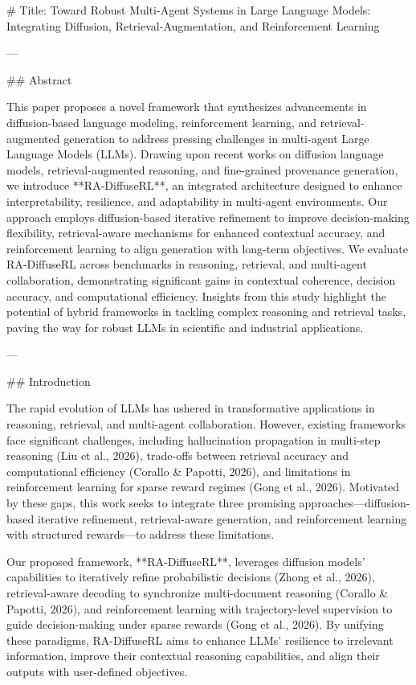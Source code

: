 # Title: Toward Robust Multi-Agent Systems in Large Language Models: Integrating Diffusion, Retrieval-Augmentation, and Reinforcement Learning

---

## Abstract

This paper proposes a novel framework that synthesizes advancements in diffusion-based language modeling, reinforcement learning, and retrieval-augmented generation to address pressing challenges in multi-agent Large Language Models (LLMs). Drawing upon recent works on diffusion language models, retrieval-augmented reasoning, and fine-grained provenance generation, we introduce **RA-DiffuseRL**, an integrated architecture designed to enhance interpretability, resilience, and adaptability in multi-agent environments. Our approach employs diffusion-based iterative refinement to improve decision-making flexibility, retrieval-aware mechanisms for enhanced contextual accuracy, and reinforcement learning to align generation with long-term objectives. We evaluate RA-DiffuseRL across benchmarks in reasoning, retrieval, and multi-agent collaboration, demonstrating significant gains in contextual coherence, decision accuracy, and computational efficiency. Insights from this study highlight the potential of hybrid frameworks in tackling complex reasoning and retrieval tasks, paving the way for robust LLMs in scientific and industrial applications.

---

## Introduction

The rapid evolution of LLMs has ushered in transformative applications in reasoning, retrieval, and multi-agent collaboration. However, existing frameworks face significant challenges, including hallucination propagation in multi-step reasoning (Liu et al., 2026), trade-offs between retrieval accuracy and computational efficiency (Corallo & Papotti, 2026), and limitations in reinforcement learning for sparse reward regimes (Gong et al., 2026). Motivated by these gaps, this work seeks to integrate three promising approaches—diffusion-based iterative refinement, retrieval-aware generation, and reinforcement learning with structured rewards—to address these limitations.

Our proposed framework, **RA-DiffuseRL**, leverages diffusion models' capabilities to iteratively refine probabilistic decisions (Zhong et al., 2026), retrieval-aware decoding to synchronize multi-document reasoning (Corallo & Papotti, 2026), and reinforcement learning with trajectory-level supervision to guide decision-making under sparse rewards (Gong et al., 2026). By unifying these paradigms, RA-DiffuseRL aims to enhance LLMs' resilience to irrelevant information, improve their contextual reasoning capabilities, and align their outputs with user-defined objectives.

